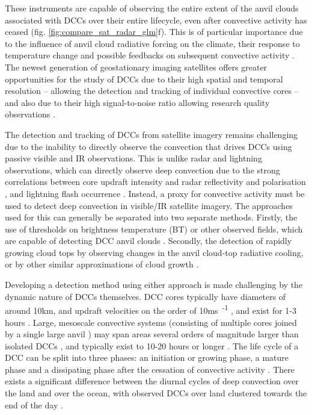 These instruments are capable of observing the entire extent of the anvil clouds associated with DCCs over their entire lifecycle, even after convective activity has ceased (fig. \ref{fig:compare_sat_radar_glm}f).
This is of particular importance due to the influence of anvil cloud radiative forcing on the climate, their response to temperature change \citep{bony_thermodynamic_2016, hartmann_tropical_2016, ceppi_cloud_2017, gasparini_what_2019} and possible feedbacks on subsequent convective activity \citep{varble_erroneous_2018}.
The newest generation of geostationary imaging satellites offers greater opportunities for the study of DCCs due to their high spatial and temporal resolution -- allowing the detection and tracking of individual convective cores \citep{heikenfeld_tobac_2019} -- and also due to their high signal-to-noise ratio allowing research quality observations \citep{iacovazzi_goes-16_2020}.

The detection and tracking of DCCs from satellite imagery remains challenging due to the inability to directly observe the convection that drives DCCs using passive visible and IR observations.
This is unlike radar and lightning observations, which can directly observe deep convection due to the strong correlations between core updraft intensity and radar reflectivity and polarisation \citep{austin_relation_1987, rosenfeld_general_1993, zipser_vertical_1994},  and lightning flash occurrence \citep{williams_relationship_1989, deierling_total_2008, wang_relationship_2017}.
Instead, a proxy for convective activity must be used to detect deep convection in visible/IR satellite imagery.
The approaches used for this can generally be separated into two separate methods. 
Firstly, the use of thresholds on brightness temperature (BT) or other observed fields, which are capable of detecting DCC anvil clouds \citep[e.g.][]{schmetz_monitoring_1997, hong_detection_2005, schroder_deep_2009, liang_integrated_2017, senf_size-resolved_2018}.
Secondly, the detection of rapidly growing cloud tops by observing changes in the anvil cloud-top radiative cooling, or by other similar approximations of cloud growth \citep{zinner_cb-tram:_2008, bedka_objective_2010, muller_novel_2019}.

Developing a detection method using either approach is made challenging by the dynamic nature of DCCs themselves.
DCC cores typically have diameters of around 10\unit{km}, and updraft velocities on the order of 10\unit{ms\textsuperscript{-1}} \citep{weisman_mesoscale_2015}, and exist for 1-3 hours \citep{chen_diurnal_1997}.
Large, mesoscale convective systems (consisting of multiple cores joined by a single large anvil \citep{roca_simple_2017}) may span areas several orders of magnitude larger than isolated DCCs \citep{houze_mesoscale_2004}, and typically exist to 10-20 hours or longer \citep{chen_diurnal_1997}.
The life cycle of a DCC can be split into three phases: an initiation or growing phase, a mature phase and a dissipating phase after the cessation of convective activity \citep{wall_life_2018}.
There exists a significant difference between the diurnal cycles of deep convection over the land and over the ocean, with observed DCCs over land clustered towards the end of the day \citep{taylor_evaluating_2017}.


